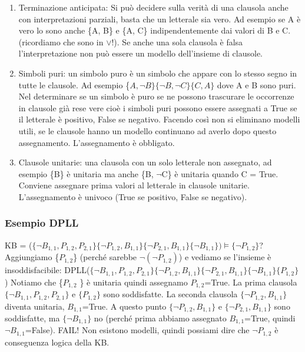 \documentclass{article}
\begin{document}
\begin{enumerate}
    \item Terminazione anticipata: Si può decidere sulla verità di una clausola anche con interpretazioni parziali, basta che un letterale sia vero. Ad esempio se A è vero lo sono anche \{A, B\} e \{A, C\} indipendentemente dai valori di B e C. (ricordiamo che sono in $\lor$!). Se anche una sola clausola è falsa l'interpretazione non può essere un modello dell'insieme di clausole. 
    \item Simboli puri: un simbolo puro è un simbolo che appare con lo stesso segno in tutte le clausole. Ad esempio \{$A, \neg B\} \{ \neg B, \neg C\} \{C, A\}$ dove A e B sono puri. Nel determinare se un simbolo è puro se ne possono trascurare le occorrenze in clausole già rese vere cioè i simboli puri possono essere assegnati a True se il letterale è positivo, False se negativo. Facendo così non si eliminano modelli utili, se le clausole hanno un modello continuano ad averlo dopo questo assegnamento. L’assegnamento è obbligato.
    \item Clausole unitarie: una clausola con un solo letterale non assegnato, ad esempio \{B\} è unitaria ma anche \{B, $\neg$C\} è unitaria quando C = True. Conviene assegnare prima valori al letterale in clausole unitarie. L'assegnamento è univoco (True se positivo, False se negativo).
\end{enumerate}

\subsubsection{Esempio DPLL}
KB = ($\{\neg B_{1,1}, P_{1,2}, P_{2,1}\} \{\neg P_{1,2}, B_{1,1}\} \{\neg P_{2,1}, B_{1,1}\} \{\neg B_{1,1}\}) \models \{\neg P_{1,2} \}$? \newline
Aggiungiamo \{$P_{1,2}$\} (perché sarebbe $\neg (\neg P_{1,2})$) e vediamo se l’insieme è insoddisfacibile: \newline 
DPLL($\{\neg B_{1,1}, P_{1,2}, P_{2,1}\} \{\neg P_{1,2}, B_{1,1}\} \{\neg P_{2,1}, B_{1,1}\} \{\neg B_{1,1}\} \{P_{1,2} \}$) \newline
Notiamo che \{$P_{1,2}$ \} è unitaria quindi assegnamo $P_{1,2}$=True. \newline
La prima clausola $\{\neg B_{1,1}, P_{1,2}, P_{2,1}\}$ e  $\{P_{1,2} \}$ sono soddisfatte. \newline
La seconda clausola $\{\neg P_{1,2}, B_{1,1}\}$ diventa unitaria, $B_{1,1}$=True. \newline A questo punto $\{\neg P_{1,2}, B_{1,1}\}$ e $\{\neg P_{2,1}, B_{1,1}\}$ sono soddisfatte, ma $\{\neg B_{1,1}\}$ no (perché prima abbiamo assegnato $B_{1,1}$=True, quindi $\neg B_{1,1}$=False). \newline FAIL! \newline 
Non esistono modelli, quindi possiami dire che $\neg P_{1,2}$ è conseguenza logica della KB.
\end{document}
